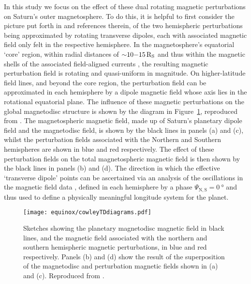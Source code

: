 In this study we focus on the effect of these dual rotating magnetic perturbations on Saturn's outer magnetosphere. To do this, it is helpful to first consider the picture put forth in \citet{andrews2010, provan2011} and references therein, of the two hemispheric perturbations being approximated by rotating transverse dipoles, each with associated magnetic field only felt in the respective hemisphere. In the magnetosphere's equatorial `core' region, within radial distances of ${\sim}10{\--}\SI{15}{R_S}$ and thus within the magnetic shells of the associated field-aligned currents \citep[e.g.][]{southwood2007}, the resulting magnetic perturbation field is rotating and quasi-uniform in magnitude. On higher-latitude field lines, and beyond the core region, the perturbation field can be approximated in each hemisphere by a dipole magnetic field whose axis lies in the rotational equatorial plane. The influence of these magnetic perturbations on the global magnetodisc structure is shown by the diagram in Figure~\ref{equinox:fig:CowleyTDdiagrams}, reproduced from \citet{cowley2017a}. The magnetospheric magnetic field, made up of Saturn's planetary dipole field and the magnetodisc field, is shown by the black lines in panels (a) and (c), whilst the perturbation fields associated with the Northern and Southern hemispheres are shown in blue and red respectively. The effect of these perturbation fields on the total magnetospheric magnetic field is then shown by the black lines in panels (b) and (d). The direction in which the effective `transverse dipole' points can be ascertained via an analysis of the oscillations in the magnetic field data \citep[e.g.][]{provan2009}, defined in each hemisphere by a phase $\Psi_\mathrm{N,S} = \SI{0}{\degree}$ and thus used to define a physically meaningful longitude system for the planet.
\begin{figure}
\centering
\texttt{[image: equinox/cowleyTDdiagrams.pdf]}
\caption[Sketches of hemispheric rotating magnetic perturbation fields, from \citet{cowley2017a}.]{Sketches showing the planetary magnetodisc magnetic field in black lines, and the magnetic field associated with the northern and southern hemispheric magnetic perturbations, in blue and red respectively. Panels (b) and (d) show the result of the superposition of the magnetodisc and perturbation magnetic fields shown in (a) and (c). Reproduced from \citet{cowley2017a}.}
\label{equinox:fig:CowleyTDdiagrams}
\end{figure}

